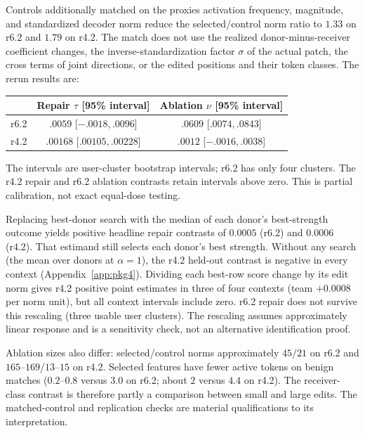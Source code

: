 Controls additionally matched on the proxies activation frequency,
magnitude, and standardized decoder norm reduce the selected/control norm
ratio to $1.33$ on r6.2 and $1.79$ on r4.2. The match does not use the
realized donor-minus-receiver coefficient changes, the inverse-standardization
factor $\sigma$ of the actual patch, the cross terms of joint directions, or
the edited positions and their token classes. The rerun results are:
\begin{center}\small
\begin{tabular}{lcc}
\toprule
 & Repair $\tau$ [95\% interval] & Ablation $\nu$ [95\% interval] \\
\midrule
r6.2 & $.0059$ [$-.0018,.0096$] & $.0609$ [$ .0074,.0843$] \\
r4.2 & $.00168$ [$ .00105,.00228$] & $.0012$ [$-.0016,.0038$] \\
\bottomrule
\end{tabular}\end{center}
The intervals are user-cluster bootstrap intervals; r6.2 has only four
clusters. The r4.2 repair and r6.2 ablation contrasts retain intervals
above zero. This is partial calibration, not exact equal-dose testing.

Replacing best-donor search with the median of each donor's best-strength
outcome yields positive headline repair contrasts of $0.0005$ (r6.2)
and $0.0006$ (r4.2). That estimand still selects each donor's best strength.
Without any search (the mean over donors at $\alpha=1$), the r4.2 held-out
contrast is negative in every context (Appendix~\ref{app:pkg4}). Dividing each best-row score change by its edit
norm gives r4.2 positive point estimates in three of four contexts
(team $+0.0008$ per norm unit), but all context intervals include zero.
r6.2 repair does not survive this rescaling (three usable user clusters).
The rescaling assumes approximately linear response and is a sensitivity
check, not an alternative identification proof.

Ablation sizes also differ: selected/control norms approximately
$45/21$ on r6.2 and $165$--$169$/$13$--$15$ on r4.2.
Selected features have fewer active tokens on benign matches
($0.2$--$0.8$ versus $3.0$ on r6.2; about $2$ versus $4.4$ on
r4.2). The receiver-class contrast is therefore partly a comparison
between small and large edits. The matched-control and replication
checks are material qualifications to its interpretation.

